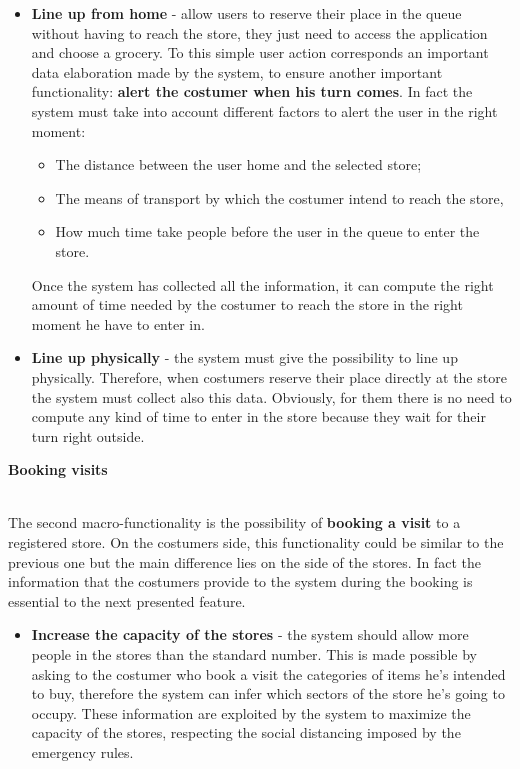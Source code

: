 \documentclass[]{article}
\begin{document}
\begin{itemize}
	\renewcommand{\labelitemi}{$-$}
	\item \textbf{Line up from home} - allow users to reserve their place in the queue without having to reach the store, they just need to access the application and choose a grocery. To this simple user action corresponds an important data elaboration made by the system, to ensure another important functionality: \textbf{alert the costumer when his turn comes}. In fact the system must take into account different factors to alert the user in the right moment:
	\begin{itemize}
		\renewcommand{\labelitemi}{$-$}
		\item The distance between the user home and the selected store;
		\item The means of transport by which the costumer intend to reach the store,
		\item How much time take people before the user in the queue to enter the store.
	\end{itemize} 
	Once the system has collected all the information, it can compute the right amount of time needed by the costumer to reach the store in the right moment he have to enter in.
	\item \textbf{Line up physically} - the system must give the possibility to line up physically. Therefore, when costumers reserve their place directly at the store the system must collect also this data. Obviously, for them there is no need to compute any kind of time to enter in the store because they wait for their turn right outside.
\end{itemize}	
\begin{large}
	\textbf{Booking visits}
\end{large}
\smallskip
\\
The second macro-functionality is the possibility of \textbf{booking a visit} to a registered store. On the costumers side, this functionality could be similar to the previous one but the main difference lies on the side of the stores. In fact the information that the costumers provide to the system during the booking is essential to the next presented feature.
\begin{itemize}
	\renewcommand{\labelitemi}{$-$}
	\item \textbf{Increase the capacity of the stores} - the system should allow more people in the stores than the standard number. This is made possible by asking to the costumer who book a visit the categories of items he's intended to buy, therefore the system can infer which sectors of the store he's going to occupy. These information are exploited by the system to maximize the capacity of the stores, respecting the social distancing imposed by the emergency rules.
\end{itemize}
\end{document}
